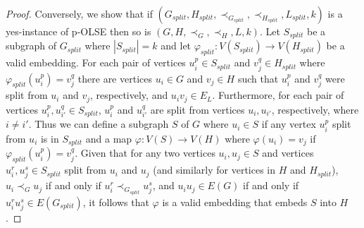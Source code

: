 \documentclass[11pt]{article}
\let\phi=\varphi
\begin{document}
\begin{proof}
Conversely, we show that if $(G_{split}, H_{split}, \prec_{G_{split}}, \prec_{H_{split}}, L_{split}, k)$ is a yes-instance of p-OLSE then so is $(G, H, \prec_G, \prec_H, L, k)$.  Let $S_{split}$ be a subgraph of $G_{split}$ where $|S_{split}| = k$ and let $\phi_{split} : V(S_{split}) \to V(H_{split})$ be a valid embedding.  For each pair of vertices $u_i^p \in S_{split}$ and $v_j^q \in H_{split}$ where $\phi_{split}(u_i^p) = v_j^q$ there are vertices $u_i \in G$ and $v_j \in H$ such that $u_i^p$ and $v_j^q$ were split from $u_i$ and $v_j$, respectively, and $u_iv_j \in E_L$.  Furthermore, for each pair of vertices $u_i^p, u_{i'}^q \in S_{split}$, $u_i^p$ and $u_{i'}^q$ are split from vertices $u_i, u_{i'}$, respectively, where $i \ne i'$.  Thus we can define a subgraph $S$ of $G$ where $u_i \in S$ if any vertex $u_i^p$ split from $u_i$ is in $S_{split}$ and a map $\phi : V(S) \to V(H)$ where $\phi(u_i) = v_j$ if $\phi_{split}(u_i^p) = v_j^q$.  Given that for any two vertices $u_i, u_j \in S$ and vertices $u_i^r, u_j^s \in S_{split}$ split from $u_i$ and $u_j$ (and similarly for vertices in $H$ and $H_{split}$), $u_i \prec_G u_j$ if and only if $u_i^r \prec_{G_{split}} u_j^s$, and $u_iu_j \in E(G)$ if and only if $u_i^ru_j^s \in E(G_{split})$, it follows that $\phi$ is a valid embedding that embeds $S$ into $H$.
\end{proof}
\end{document}
